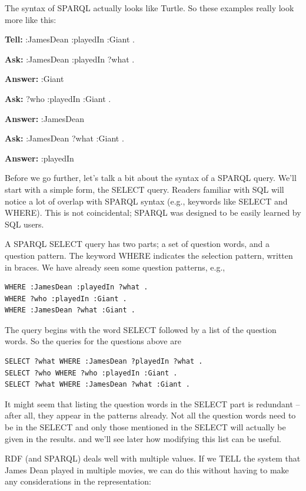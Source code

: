 The syntax of SPARQL actually looks like Turtle. So these examples
really look more like this:

\textbf{\textbf{Tell:}} :JamesDean :playedIn :Giant . 

\textbf{\textbf{Ask:}} :JamesDean :playedIn ?what .

\textbf{\textbf{Answer:}} :Giant

\textbf{\textbf{Ask:}} ?who :playedIn :Giant .

\textbf{\textbf{Answer:}} :JamesDean

\textbf{\textbf{Ask:}} :JamesDean ?what :Giant .

\textbf{\textbf{Answer:}} :playedIn

Before we go further, let's talk a bit about the syntax of a SPARQL
query. We'll start with a simple form, the SELECT query. Readers
familiar with SQL will notice a lot of overlap with SPARQL syntax (e.g.,
keywords like SELECT and WHERE). This is not coincidental; SPARQL was
designed to be easily learned by SQL users.

A SPARQL SELECT query has two parts; a set of question words, and a
question pattern. The keyword WHERE indicates the selection pattern,
written in braces. We have already seen some question patterns, e.g.,

\begin{lstlisting}
WHERE :JamesDean :playedIn ?what .
WHERE ?who :playedIn :Giant .
WHERE :JamesDean ?what :Giant .
\end{lstlisting}

The query begins with the word SELECT followed by a list of the question
words. So the queries for the questions above are

\begin{lstlisting}
SELECT ?what WHERE :JamesDean ?playedIn ?what .
SELECT ?who WHERE ?who :playedIn :Giant .
SELECT ?what WHERE :JamesDean ?what :Giant .
\end{lstlisting}

It might seem that listing the question words in the SELECT part is
redundant -- after all, they appear in the patterns already. Not all the
question words need to be in the SELECT and only those mentioned in the
SELECT will actually be given in the results. and we'll see later how
modifying this list can be useful.

RDF (and SPARQL) deals well with multiple values. If we TELL the system
that James Dean played
in multiple movies, we can do this without having to make any
considerations in the representation:

